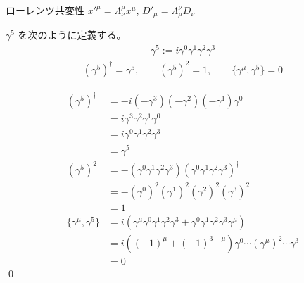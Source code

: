 \documentclass[uplatex,dvipdfmx,a4paper,11pt]{jlreq}
\makeatletter
\numberwithin{equation}{section}
\theoremstyle{definition}
\renewenvironment{proof}[1][\proofname]{\par
  \normalfont
  \topsep6\p@\@plus6\p@ \trivlist
  \item[\hskip\labelsep{\bfseries #1}\@addpunct{\bfseries}]\ignorespaces\quad\par
}{%
  \qed\endtrivlist\@endpefalse
}
\renewcommand\proofname{証明}
\makeatother
\begin{document}
\begin{theorem}
  ローレンツ共変性
  $x'^\mu = \Lambda^\mu_\nu x^\mu$, $D'_\mu = \Lambda_\mu^\nu D_\nu$
\end{theorem}

\begin{proposition}
  $\gamma^5$ を次のように定義する。
  \begin{align}
    \gamma^5 := i\gamma^0\gamma^1\gamma^2\gamma^3
  \end{align}
  \begin{align}
    (\gamma^5)^\dagger = \gamma^5, \qquad (\gamma^5)^2 = 1, \qquad \lbrace\gamma^\mu, \gamma^5\rbrace = 0
  \end{align}
\end{proposition}
\begin{proof}
  \begin{align}
    (\gamma^5)^\dagger                 & = -i(-\gamma^3)(-\gamma^2)(-\gamma^1)\gamma^0                                                \\
                                       & = i\gamma^3\gamma^2\gamma^1\gamma^0                                                          \\
                                       & = i\gamma^0\gamma^1\gamma^2\gamma^3                                                          \\
                                       & = \gamma^5                                                                                   \\
    (\gamma^5)^2                       & = -(\gamma^0\gamma^1\gamma^2\gamma^3)(\gamma^0\gamma^1\gamma^2\gamma^3)^\dagger              \\
                                       & = - (\gamma^0)^2(\gamma^1)^2(\gamma^2)^2(\gamma^3)^2                                         \\
                                       & = 1                                                                                          \\
    \lbrace\gamma^\mu, \gamma^5\rbrace & = i(\gamma^\mu\gamma^0\gamma^1\gamma^2\gamma^3 + \gamma^0\gamma^1\gamma^2\gamma^3\gamma^\mu) \\
                                       & = i((-1)^\mu + (-1)^{3-\mu})\gamma^0\cdots(\gamma^\mu)^2\cdots\gamma^3                       \\
                                       & = 0
  \end{align}
\end{proof}
\end{document}
